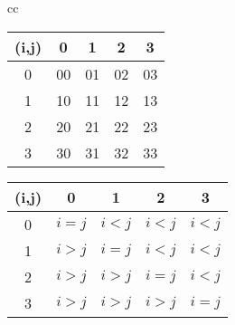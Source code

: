 \documentclass[a4paper]{jarticle}
\begin{document}
{\begin{table}[htbp]
 \begin{center}
  \begin{tabular}{cc}
   \begin{minipage}{0.4\hsize}
    \begin{tabular}{|c||c|c|c|c|}
     \hline
     (i,j) & 0  & 1  & 2  & 3 \\
     \hline
     \hline
     0   & 00 & 01 & 02 & 03\\
     \hline
     1   & 10 & 11 & 12 & 13\\
     \hline
     2   & 20 & 21 & 22 & 23\\
     \hline
     3   & 30 & 31 & 32 & 33\\
     \hline
    \end{tabular}
   \end{minipage}
   \begin{minipage}{0.4\hsize}
    \begin{tabular}{|c||c|c|c|c|}
     \hline
     (i,j) &   0   &   1   &   2   &   3  \\
     \hline
     \hline
     0  & $i=j$ & $i<j$ & $i<j$ & $i<j$\\
     \hline
     1  & $i>j$ & $i=j$ & $i<j$ & $i<j$\\
     \hline
     2  & $i>j$ & $i>j$ & $i=j$ & $i<j$\\
     \hline
     3  & $i>j$ & $i>j$ & $i>j$ & $i=j$\\
     \hline
    \end{tabular}
   \end{minipage}
  \end{tabular}
 \end{center}
\end{table}

}
\end{document}
